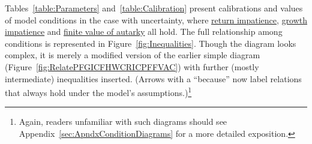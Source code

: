 \documentclass[BufferStockTheory]{subfiles}
\begin{document}
Tables~\ref{table:Parameters} and~\ref{table:Calibration} present calibrations and values of model conditions in the case with uncertainty, where \hyperlink{RIC}{return impatience}, \hyperlink{GICRaw}{growth impatience} and \hyperlink{FVAC}{finite value of autarky} all hold.
The full relationship among conditions is represented in Figure~\ref{fig:Inequalities}.
Though the diagram looks complex, it is merely a modified version of the earlier simple diagram (Figure~\ref{fig:RelatePFGICFHWCRICPFFVAC}) with further (mostly intermediate) inequalities inserted.
(Arrows with a ``because'' now label relations that always hold under the model's assumptions.)\footnote{Again, readers unfamiliar with such diagrams should see Appendix~\ref{sec:ApndxConditionDiagrams} for a more detailed exposition.}

\renewcommand{\figName}{Inequalities} 
\renewcommand{\figFile}{\figName} 
\hypertarget{\figFile}{}
\end{document}
